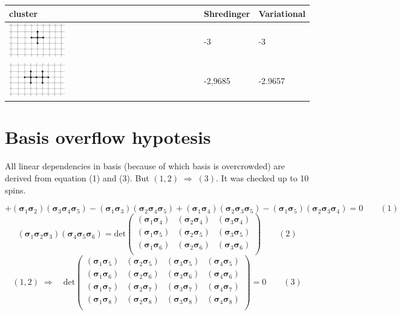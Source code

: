 \documentclass[11pt]{article} %
\newcommand{\cc}{\bm{\sigma}}
\begin{document}
\begin{tabular}{|l|l|l|}
\hline
cluster & Shredinger & Variational \\
\hline
\includegraphics[width=0.3\textwidth]{lattice-crest.png} & -3 & -3 \\
\hline
\includegraphics[width=0.3\textwidth]{lattice-double-crest.png} & -2,9685 & -2.9657 \\
\hline
\end{tabular}

\section{Basis overflow hypotesis}

All linear dependencies in basis (because of which basis is overcrowded) are derived from equation (1) and (3).
But $(1,2)\;\Rightarrow\;(3)$.
It was checked up to 10 spins.

$$+(\cc_1\cc_2)(\cc_3\cc_4\cc_5)-(\cc_1\cc_3)(\cc_2\cc_4\cc_5)+(\cc_1\cc_4)(\cc_2\cc_3\cc_5)-(\cc_1\cc_5)(\cc_2\cc_3\cc_4)=0   \qquad(1)$$
$$(\cc_1\cc_2\cc_3)(\cc_4\cc_5\cc_6) = \mathrm{det}
\begin{pmatrix}
(\cc_1\cc_4) & (\cc_2\cc_4) & (\cc_3\cc_4) \\
(\cc_1\cc_5) & (\cc_2\cc_5) & (\cc_3\cc_5) \\
(\cc_1\cc_6) & (\cc_2\cc_6) & (\cc_3\cc_6) \\
\end{pmatrix}
\qquad(2)
$$
$$(1,2)\;\Rightarrow\quad
\mathrm{det}
\begin{pmatrix}
(\cc_1\cc_5) & (\cc_2\cc_5) & (\cc_3\cc_5) & (\cc_4\cc_5) \\
(\cc_1\cc_6) & (\cc_2\cc_6) & (\cc_3\cc_6) & (\cc_4\cc_6) \\
(\cc_1\cc_7) & (\cc_2\cc_7) & (\cc_3\cc_7) & (\cc_4\cc_7) \\
(\cc_1\cc_8) & (\cc_2\cc_8) & (\cc_3\cc_8) & (\cc_4\cc_8) \\
\end{pmatrix} =0
\qquad(3)
$$
\end{document}
